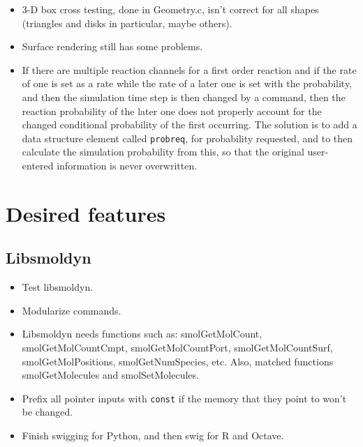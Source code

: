 \documentclass {scrbook}
\newcommand {\ttt} {\texttt}
\begin{document}
\begin{itemize}
\item 3-D box cross testing, done in Geometry.c, isn't correct for all shapes (triangles and disks in particular, maybe others).
\item Surface rendering still has some problems.
\item If there are multiple reaction channels for a first order reaction and if the rate of one is set as a rate while the rate of a later one is set with the probability, and then the simulation time step is then changed by a command, then the reaction probability of the later one does not properly account for the changed conditional probability of the first occurring. The solution is to add a data structure element called \ttt{probreq}, for probability requested, and to then calculate the simulation probability from this, so that the original user-entered information is never overwritten.
\end{itemize}

\section{Desired features}

\subsection*{Libsmoldyn}
\begin{itemize}
\item Test libsmoldyn.
\item Modularize commands.
\item Libsmoldyn needs functions such as: smolGetMolCount, smolGetMolCountCmpt, smolGetMolCountPort, smolGetMolCountSurf, smolGetMolPositions, smolGetNumSpecies, etc. Also, matched functions smolGetMolecules and smolSetMolecules.
\item Prefix all pointer inputs with \ttt{const} if the memory that they point to won't be changed.
\item Finish swigging for Python, and then swig for R and Octave.
\end{itemize}
\end{document}
